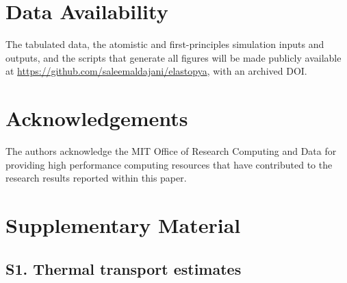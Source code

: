 \documentclass[final,3p,times]{elsarticle}
\begin{document}
\section*{Data Availability}
The tabulated data, the atomistic and first-principles simulation inputs and outputs, and the scripts that generate all figures will be made publicly available at \url{https://github.com/saleemaldajani/elastopya}, with an archived DOI.


\section*{Acknowledgements}
The authors acknowledge the MIT Office of Research Computing and Data for providing high performance computing resources that have contributed to the research results reported within this paper.





\newpage
\clearpage

\section*{Supplementary Material}

\setcounter{figure}{0}
\renewcommand{\thefigure}{S\arabic{figure}}
\renewcommand{\thetable}{S\arabic{table}}

\subsection*{S1. Thermal transport estimates}
\end{document}
